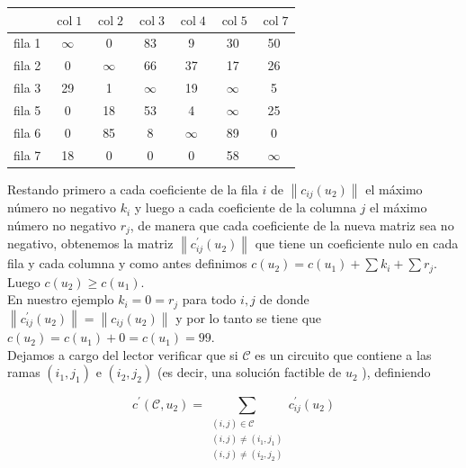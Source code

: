 \documentclass[10pt]{article}
\begin{document}
\begin{center}
\begin{tabular}{|c|c|c|c|c|c|c|}
\hline
 & $\operatorname{col} 1$ & $\operatorname{col} 2$ & $\operatorname{col} 3$ & $\operatorname{col} 4$ & $\operatorname{col} 5$ & $\operatorname{col} 7$ \\
\hline
fila 1 & $\infty$ & 0 & 83 & 9 & 30 & 50 \\
\hline
fila 2 & 0 & $\infty$ & 66 & 37 & 17 & 26 \\
\hline
fila 3 & 29 & 1 & $\infty$ & 19 & $\infty$ & 5 \\
\hline
fila 5 & 0 & 18 & 53 & 4 & $\infty$ & 25 \\
\hline
fila 6 & 0 & 85 & 8 & $\infty$ & 89 & 0 \\
\hline
fila 7 & 18 & 0 & 0 & 0 & 58 & $\infty$ \\
\hline
\end{tabular}
\end{center}

Restando primero a cada coeficiente de la fila $i$ de $\left\|c_{i j}\left(u_{2}\right)\right\|$ el máximo número no negativo $k_{i}$ y luego a cada coeficiente de la columna $j$ el máximo número no negativo $r_{j}$, de manera que cada coeficiente de la nueva matriz sea no negativo, obtenemos la matriz $\left\|c_{i j}^{\prime}\left(u_{2}\right)\right\|$ que tiene un coeficiente nulo en cada fila y cada columna y como antes definimos $c\left(u_{2}\right)=c\left(u_{1}\right)+\sum k_{i}+\sum r_{j}$. Luego $c\left(u_{2}\right) \geq c\left(u_{1}\right)$.\\
En nuestro ejemplo $k_{i}=0=r_{j}$ para todo $i, j$ de donde $\left\|c_{i j}^{\prime}\left(u_{2}\right)\right\|=\left\|c_{i j}\left(u_{2}\right)\right\|$ y por lo tanto se tiene que $c\left(u_{2}\right)=c\left(u_{1}\right)+0=c\left(u_{1}\right)=99$.\\
Dejamos a cargo del lector verificar que si $\mathcal{C}$ es un circuito que contiene a las ramas $\left(i_{1}, j_{1}\right)$ e $\left(i_{2}, j_{2}\right)$ (es decir, una solución factible de $u_{2}$ ), definiendo

$$
c^{\prime}\left(\mathcal{C}, u_{2}\right)=\sum_{\substack{(i, j) \in \mathcal{C} \\(i, j) \neq\left(i_{1}, j_{1}\right) \\(i, j) \neq\left(i_{2}, j_{2}\right)}} c_{i j}^{\prime}\left(u_{2}\right)
$$
\end{document}
